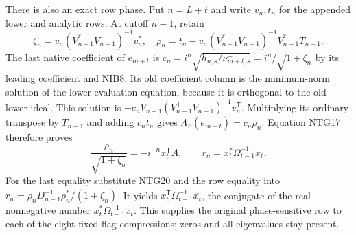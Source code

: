 \documentclass[11pt,a4paper]{article}
\begin{document}
There is also an exact row phase. Put $n=L+t$ and write
$v_n,t_n$ for the appended lower and analytic rows. At
cutoff $n-1$, retain
\[
 \zeta_n=v_n(V_{n-1}^*V_{n-1})^{-1}v_n^*,\quad
 \rho_n=t_n-v_n(V_{n-1}^*V_{n-1})^{-1}V_{n-1}^*T_{n-1}.
                                                               \tag{NTG21}
\]
The last native coefficient of $e_{m+t}$ is
$c_n=i^n\sqrt{h_{n,s}/\nu_{m+t,s}^-}
     =i^n/\sqrt{1+\zeta_n}$ by its leading coefficient
and NIB8. Its old coefficient column is the minimum-norm
solution of the lower evaluation equation, because it is
orthogonal to the old lower ideal. This solution is
$-c_n\overline{V_{n-1}}(V_{n-1}^{\mathsf T}
\overline{V_{n-1}})^{-1}v_n^{\mathsf T}$.
Multiplying its ordinary transpose by $T_{n-1}$ and adding
$c_nt_n$ gives
$\Lambda_F(e_{m+t})=c_n\rho_n$. Equation NTG17 therefore
proves
\[
 \boxed{\quad
 \frac{\rho_n}{\sqrt{1+\zeta_n}}
        =-i^{-n}x_t^{\mathsf T}A,\qquad
 r_n=x_t^*\Omega_{t-1}^{-1}x_t .
 \quad}                                                        \tag{NTG22}
\]
For the last equality substitute NTG20 and the row equality
into $r_n=\rho_nD_{n-1}^{-1}\rho_n^*/(1+\zeta_n)$.
It yields $x_t^{\mathsf T}\overline{\Omega_{t-1}^{-1}}
\overline{x_t}$, the conjugate of the real nonnegative
number $x_t^*\Omega_{t-1}^{-1}x_t$. This supplies the
original phase-sensitive row to each of the eight fixed
flag compressions; zeros and all eigenvalues stay present.
\end{document}
